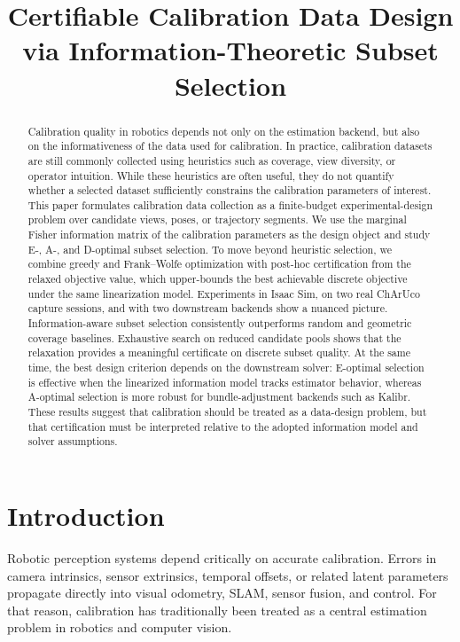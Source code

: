 \documentclass[11pt]{article}
\title{Certifiable Calibration Data Design via Information-Theoretic Subset Selection}
\author{}
\date{}
\begin{document}
\maketitle

\begin{abstract}
Calibration quality in robotics depends not only on the estimation backend, but
also on the informativeness of the data used for calibration. In practice,
calibration datasets are still commonly collected using heuristics such as
coverage, view diversity, or operator intuition. While these heuristics are
often useful, they do not quantify whether a selected dataset sufficiently
constrains the calibration parameters of interest. This paper formulates
calibration data collection as a finite-budget experimental-design problem over
candidate views, poses, or trajectory segments. We use the marginal Fisher
information matrix of the calibration parameters as the design object and study
E-, A-, and D-optimal subset selection. To move beyond heuristic selection, we
combine greedy and Frank--Wolfe optimization with post-hoc certification from
the relaxed objective value, which upper-bounds the best achievable discrete
objective under the same linearization model. Experiments in Isaac Sim, on two
real ChArUco capture sessions, and with two downstream backends show a nuanced
picture. Information-aware subset selection consistently outperforms random and
geometric coverage baselines. Exhaustive search on reduced candidate pools shows
that the relaxation provides a meaningful certificate on discrete subset
quality. At the same time, the best design criterion depends on the downstream
solver: E-optimal selection is effective when the linearized information model
tracks estimator behavior, whereas A-optimal selection is more robust for
bundle-adjustment backends such as Kalibr. These results suggest that
calibration should be treated as a data-design problem, but that certification
must be interpreted relative to the adopted information model and solver
assumptions.
\end{abstract}

\section{Introduction}
Robotic perception systems depend critically on accurate calibration.
Errors in camera intrinsics, sensor extrinsics, temporal offsets, or related
latent parameters propagate directly into visual odometry, SLAM, sensor fusion,
and control. For that reason, calibration has traditionally been treated as a
central estimation problem in robotics and computer vision.
\end{document}

